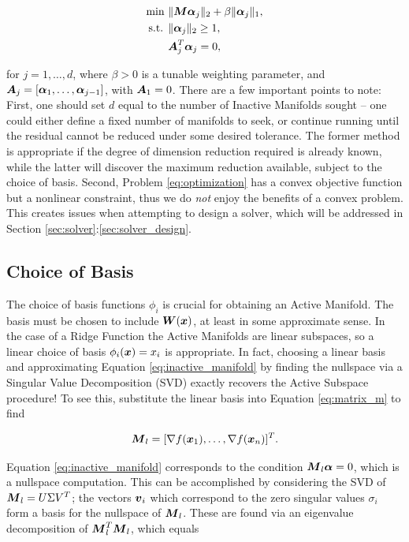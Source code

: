 \documentclass[]{aiaa-tc}%
\begin{document}
\begin{equation}
\begin{aligned}
\label{eq:optimization}
\text{min  }& \|\boldsymbol{M}\boldsymbol{\alpha}_j\|_2 + \beta\|\boldsymbol{\alpha}_j\|_1, \\
\text{s.t. }& \|\boldsymbol{\alpha}_j\|_2\geq1, \\
            & \boldsymbol{A}_j^T \boldsymbol{\alpha}_j = 0,
\end{aligned}
\end{equation}

for $j=1,\dots,d$, where $\beta>0$ is a tunable weighting parameter, and $\boldsymbol{A}_j=[\boldsymbol{\alpha}_1,\dots,\boldsymbol{\alpha}_{j-1}]$, with $\boldsymbol{A}_1=0$. There are a few important points to note: First, one should set $d$ equal to the number of Inactive Manifolds sought -- one could either define a fixed number of manifolds to seek, or continue running until the residual cannot be reduced under some desired tolerance. The former method is appropriate if the degree of dimension reduction required is already known, while the latter will discover the maximum reduction available, subject to the choice of basis. Second, Problem \ref{eq:optimization} has a convex objective function but a nonlinear constraint, thus we do \emph{not} enjoy the benefits of a convex problem. This creates issues when attempting to design a solver, which will be addressed in Section \ref{sec:solver}:\ref{sec:solver_design}.

\subsection{Choice of Basis} \label{sec:basis}
The choice of basis functions $\phi_i$ is crucial for obtaining an Active Manifold. The basis must be chosen to include $\boldsymbol{W}(\boldsymbol{x})$, at least in some approximate sense. In the case of a Ridge Function the Active Manifolds are linear subspaces, so a linear choice of basis $\phi_i(\boldsymbol{x}) = x_i$ is appropriate. In fact, choosing a linear basis and approximating Equation \ref{eq:inactive_manifold} by finding the nullspace via a Singular Value Decomposition (SVD) exactly recovers the Active Subspace procedure! To see this, substitute the linear basis into Equation \ref{eq:matrix_m} to find

\begin{equation}
\label{eq:matrix_m_linear}
\boldsymbol{M}_l = [\nabla f(\boldsymbol{x}_1),\dots,\nabla f(\boldsymbol{x}_n)]^T.
\end{equation}

Equation \ref{eq:inactive_manifold} corresponds to the condition $\boldsymbol{M}_l\boldsymbol{\alpha}=0$, which is a nullspace computation. This can be accomplished by considering the SVD of $\boldsymbol{M}_l=U\Sigma V^T$; the vectors $\boldsymbol{v}_i$ which correspond to the zero singular values $\sigma_i$ form a basis for the nullspace of $\boldsymbol{M}_l$. These are found via an eigenvalue decomposition of $\boldsymbol{M}_l^T\boldsymbol{M}_l$, which equals
\end{document}
